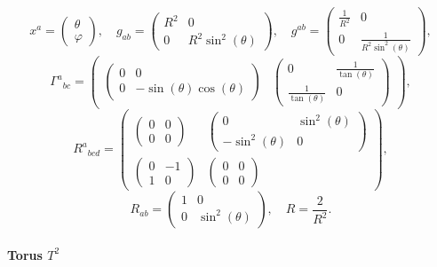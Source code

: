 \documentclass[11pt]{article}
\begin{document}
    $$x^{a}=\begin{pmatrix}\theta\\\varphi\end{pmatrix},\quad g_{ab}=\begin{pmatrix} R^{2} & 0\\ 0 & R^{2} \sin^{2}{\left(\theta \right)} \end{pmatrix},\quad g^{ab}=\begin{pmatrix} \frac{1}{R^{2}} & 0\\ 0 & \frac{1}{R^{2} \sin^{2}{\left(\theta \right)}} \end{pmatrix},$$
$${\Gamma^{a}}_{bc}=\begin{pmatrix} \begin{pmatrix} 0 & 0\\ 0 & - \sin{\left(\theta \right)} \cos{\left(\theta \right)} \end{pmatrix} & \begin{pmatrix} 0 & \frac{1}{\tan{\left(\theta \right)}}\\ \frac{1}{\tan{\left(\theta \right)}} & 0 \end{pmatrix} \end{pmatrix},$$
$${R^{a}}_{bcd}=\begin{pmatrix} \begin{pmatrix} 0 & 0\\ 0 & 0 \end{pmatrix} & \begin{pmatrix} 0 & \sin^{2}{\left(\theta \right)}\\ - \sin^{2}{\left(\theta \right)} & 0 \end{pmatrix}\\ \begin{pmatrix} 0 & -1\\ 1 & 0 \end{pmatrix} & \begin{pmatrix} 0 & 0\\ 0 & 0 \end{pmatrix} \end{pmatrix},$$
$$R_{ab}=\begin{pmatrix} 1 & 0\\ 0 & \sin^{2}{\left(\theta \right)} \end{pmatrix},\quad R=\frac{2}{R^{2}}.$$

\newpage %

    \hypertarget{torus-t2}{%
\paragraph{\texorpdfstring{Torus
\(T^2\)}{Torus T\^{}2}}\label{torus-t2}}
\end{document}
